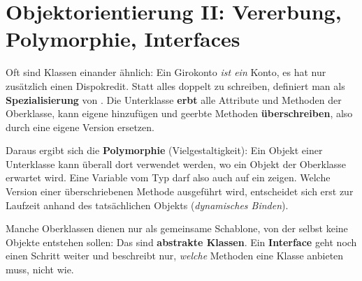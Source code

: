 \section{Objektorientierung II: Vererbung, Polymorphie, Interfaces}
\worum
Oft sind Klassen einander ähnlich: Ein Girokonto \emph{ist ein} Konto, es hat nur zusätzlich einen Dispokredit. Statt alles doppelt zu schreiben, definiert man  als \textbf{Spezialisierung} von . Die Unterklasse \textbf{erbt} alle Attribute und Methoden der Oberklasse, kann eigene hinzufügen und geerbte Methoden \textbf{überschreiben}, also durch eine eigene Version ersetzen.

Daraus ergibt sich die \textbf{Polymorphie} (Vielgestaltigkeit): Ein Objekt einer Unterklasse kann überall dort verwendet werden, wo ein Objekt der Oberklasse erwartet wird. Eine Variable vom Typ  darf also auch auf ein  zeigen. Welche Version einer überschriebenen Methode ausgeführt wird, entscheidet sich erst zur Laufzeit anhand des tatsächlichen Objekts (\emph{dynamisches Binden}).

Manche Oberklassen dienen nur als gemeinsame Schablone, von der selbst keine Objekte entstehen sollen: Das sind \textbf{abstrakte Klassen}. Ein \textbf{Interface} geht noch einen Schritt weiter und beschreibt nur, \emph{welche} Methoden eine Klasse anbieten muss, nicht wie.

